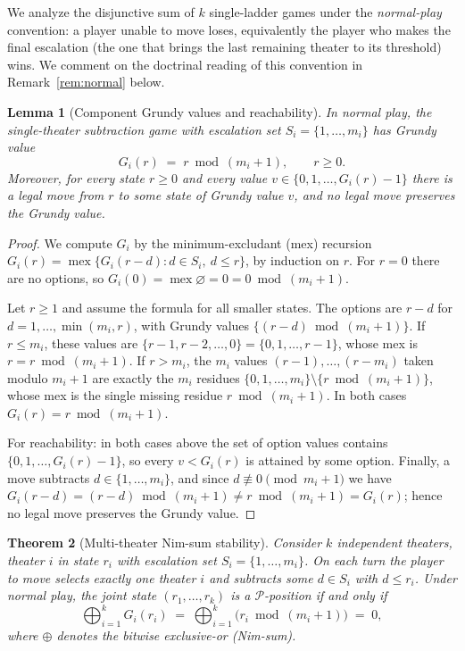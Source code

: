 \documentclass[11pt]{article}
\theoremstyle{plain}
\newtheorem{theorem}{Theorem}[section]
\newtheorem{lemma}[theorem]{Lemma}
\theoremstyle{definition}
\theoremstyle{remark}
\begin{document}
We analyze the disjunctive sum of $k$ single-ladder games under the
\emph{normal-play} convention: a player unable to move loses, equivalently
the player who makes the final escalation (the one that brings the last
remaining theater to its threshold) wins. We comment on the doctrinal
reading of this convention in Remark~\ref{rem:normal} below.

\begin{lemma}[Component Grundy values and reachability]\label{lem:grundy}
In normal play, the single-theater subtraction game with escalation set
$S_i=\{1,\dots,m_i\}$ has Grundy value
\[
  G_i(r) \;=\; r \bmod (m_i+1), \qquad r \ge 0 .
\]
Moreover, for every state $r\ge 0$ and every value
$v \in \{0,1,\dots,G_i(r)-1\}$ there is a legal move from $r$ to some
state of Grundy value $v$, and no legal move preserves the Grundy value.
\end{lemma}

\begin{proof}
We compute $G_i$ by the minimum-excludant (mex) recursion
$G_i(r)=\operatorname{mex}\{G_i(r-d): d\in S_i,\ d\le r\}$, by induction on
$r$. For $r=0$ there are no options, so $G_i(0)=\operatorname{mex}
\varnothing = 0 = 0\bmod(m_i+1)$.

Let $r\ge 1$ and assume the formula for all smaller states. The options
are $r-d$ for $d=1,\dots,\min(m_i,r)$, with Grundy values
$\{(r-d)\bmod(m_i+1)\}$. If $r\le m_i$, these values are
$\{r-1,r-2,\dots,0\}=\{0,1,\dots,r-1\}$, whose mex is $r=r\bmod(m_i+1)$.
If $r> m_i$, the $m_i$ values $(r-1),\dots,(r-m_i)$ taken modulo $m_i+1$
are exactly the $m_i$ residues $\{0,1,\dots,m_i\}\setminus\{r\bmod(m_i+1)\}$,
whose mex is the single missing residue $r\bmod(m_i+1)$. In both cases
$G_i(r)=r\bmod(m_i+1)$.

For reachability: in both cases above the set of option values contains
$\{0,1,\dots,G_i(r)-1\}$, so every $v<G_i(r)$ is attained by some option.
Finally, a move subtracts $d\in\{1,\dots,m_i\}$, and since
$d\not\equiv 0 \pmod{m_i+1}$ we have $G_i(r-d)=(r-d)\bmod(m_i+1)\neq
r\bmod(m_i+1)=G_i(r)$; hence no legal move preserves the Grundy value.
\end{proof}

\begin{theorem}[Multi-theater Nim-sum stability]\label{thm:B}
Consider $k$ independent theaters, theater $i$ in state $r_i$ with
escalation set $S_i=\{1,\dots,m_i\}$. On each turn the player to move
selects exactly one theater $i$ and subtracts some $d\in S_i$ with
$d\le r_i$. Under normal play, the joint state $(r_1,\dots,r_k)$ is a
$\mathcal{P}$-position if and only if
\[
  \bigoplus_{i=1}^{k} G_i(r_i)
  \;=\;
  \bigoplus_{i=1}^{k}\big(r_i \bmod (m_i+1)\big)
  \;=\; 0,
\]
where $\oplus$ denotes the bitwise exclusive-or (Nim-sum).
\end{theorem}
\end{document}
